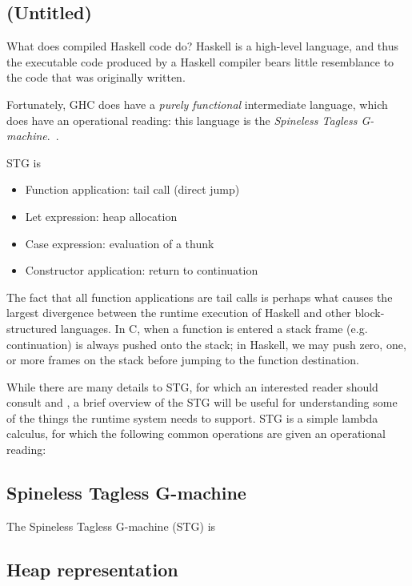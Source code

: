 \subsection{(Untitled)}

What does compiled Haskell code do?  Haskell is a high-level language,
and thus the executable code produced by a Haskell compiler bears little
resemblance to the code that was originally written.

Fortunately, GHC does have a \emph{purely
functional} intermediate language, which does have an operational
reading: this language is the \emph{Spineless Tagless
G-machine}.~\cite{PeytonJones1992}.

STG is 

\begin{itemize}
    \item Function application: tail call (direct jump)
    \item Let expression: heap allocation
    \item Case expression: evaluation of a thunk
    \item Constructor application: return to continuation
\end{itemize}



The fact that all function applications are tail calls is perhaps what
causes the largest divergence between the runtime execution of Haskell
and other block-structured languages.  In C, when a function is entered
a stack frame (e.g. continuation) is always pushed onto the stack; in
Haskell, we may push zero, one, or more frames on the stack before
jumping to the function destination.

While there are many details to STG, for which an interested reader
should consult \cite{PeytonJones1992} and \cite{Marlow2006}, a brief
overview of the STG will be useful for understanding some of the things
the runtime system needs to support.  STG is a simple lambda calculus,
for which the following common operations are given an operational
reading:

\subsection{Spineless Tagless G-machine}

The Spineless Tagless G-machine (STG) is 

\subsection{Heap representation}

